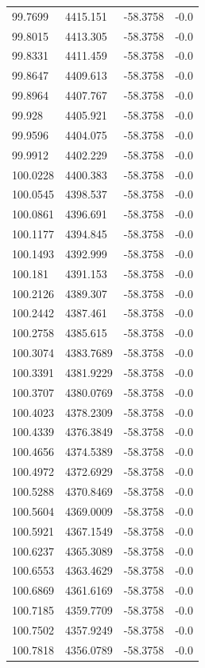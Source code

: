 \begin{table}[H]
\begin{tabular}{llll}
99.7699 & 4415.151 & -58.3758 & -0.0 \\
99.8015 & 4413.305 & -58.3758 & -0.0 \\
99.8331 & 4411.459 & -58.3758 & -0.0 \\
99.8647 & 4409.613 & -58.3758 & -0.0 \\
99.8964 & 4407.767 & -58.3758 & -0.0 \\
99.928 & 4405.921 & -58.3758 & -0.0 \\
99.9596 & 4404.075 & -58.3758 & -0.0 \\
99.9912 & 4402.229 & -58.3758 & -0.0 \\
100.0228 & 4400.383 & -58.3758 & -0.0 \\
100.0545 & 4398.537 & -58.3758 & -0.0 \\
100.0861 & 4396.691 & -58.3758 & -0.0 \\
100.1177 & 4394.845 & -58.3758 & -0.0 \\
100.1493 & 4392.999 & -58.3758 & -0.0 \\
100.181 & 4391.153 & -58.3758 & -0.0 \\
100.2126 & 4389.307 & -58.3758 & -0.0 \\
100.2442 & 4387.461 & -58.3758 & -0.0 \\
100.2758 & 4385.615 & -58.3758 & -0.0 \\
100.3074 & 4383.7689 & -58.3758 & -0.0 \\
100.3391 & 4381.9229 & -58.3758 & -0.0 \\
100.3707 & 4380.0769 & -58.3758 & -0.0 \\
100.4023 & 4378.2309 & -58.3758 & -0.0 \\
100.4339 & 4376.3849 & -58.3758 & -0.0 \\
100.4656 & 4374.5389 & -58.3758 & -0.0 \\
100.4972 & 4372.6929 & -58.3758 & -0.0 \\
100.5288 & 4370.8469 & -58.3758 & -0.0 \\
100.5604 & 4369.0009 & -58.3758 & -0.0 \\
100.5921 & 4367.1549 & -58.3758 & -0.0 \\
100.6237 & 4365.3089 & -58.3758 & -0.0 \\
100.6553 & 4363.4629 & -58.3758 & -0.0 \\
100.6869 & 4361.6169 & -58.3758 & -0.0 \\
100.7185 & 4359.7709 & -58.3758 & -0.0 \\
100.7502 & 4357.9249 & -58.3758 & -0.0 \\
100.7818 & 4356.0789 & -58.3758 & -0.0 \\

\end{tabular}
\end{table}
